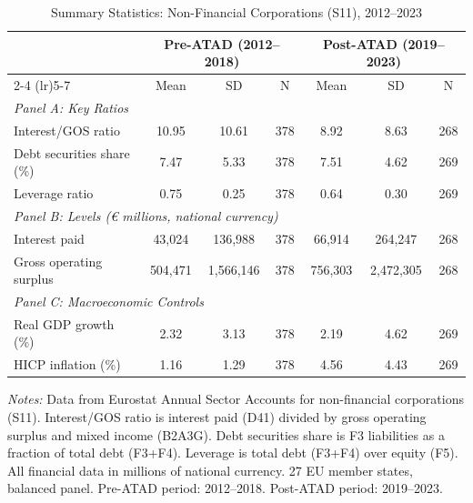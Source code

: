 \begin{table}[t]
\centering
\caption{Summary Statistics: Non-Financial Corporations (S11), 2012--2023}
\label{tab:sumstats}
\small
\begin{tabular}{lcccccc}
\toprule
& \multicolumn{3}{c}{Pre-ATAD (2012--2018)} & \multicolumn{3}{c}{Post-ATAD (2019--2023)} \\
\cmidrule(lr){2-4} \cmidrule(lr){5-7}
& Mean & SD & N & Mean & SD & N \\
\midrule
\multicolumn{7}{l}{\textit{Panel A: Key Ratios}} \\[3pt]
Interest/GOS ratio & 10.95 & 10.61 & 378 & 8.92 & 8.63 & 268 \\
Debt securities share (\%) & 7.47 & 5.33 & 378 & 7.51 & 4.62 & 269 \\
Leverage ratio & 0.75 & 0.25 & 378 & 0.64 & 0.30 & 269 \\
\midrule
\multicolumn{7}{l}{\textit{Panel B: Levels (\euro{} millions, national currency)}} \\[3pt]
Interest paid & 43,024 & 136,988 & 378 & 66,914 & 264,247 & 268 \\
Gross operating surplus & 504,471 & 1,566,146 & 378 & 756,303 & 2,472,305 & 268 \\
\midrule
\multicolumn{7}{l}{\textit{Panel C: Macroeconomic Controls}} \\[3pt]
Real GDP growth (\%) & 2.32 & 3.13 & 378 & 2.19 & 4.62 & 269 \\
HICP inflation (\%) & 1.16 & 1.29 & 378 & 4.56 & 4.43 & 269 \\
\bottomrule
\end{tabular}
\begin{tablenotes}
\item \textit{Notes:} Data from Eurostat Annual Sector Accounts for non-financial corporations (S11). Interest/GOS ratio is interest paid (D41) divided by gross operating surplus and mixed income (B2A3G). Debt securities share is F3 liabilities as a fraction of total debt (F3+F4). Leverage is total debt (F3+F4) over equity (F5). All financial data in millions of national currency. 27 EU member states, balanced panel. Pre-ATAD period: 2012--2018. Post-ATAD period: 2019--2023.
\end{tablenotes}
\end{table}
